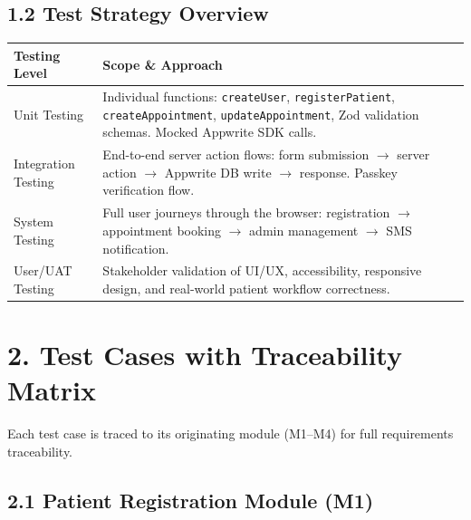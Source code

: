 \documentclass[12pt,a4paper]{article}
\begin{document}
\subsection{1.2 Test Strategy Overview}

\begin{tabular}{@{}p{3cm}p{11cm}@{}}
    \toprule
    \textbf{Testing Level} & \textbf{Scope \& Approach} \\
    \midrule
    Unit Testing        & Individual functions: \texttt{createUser}, \texttt{registerPatient}, \texttt{createAppointment}, \texttt{updateAppointment}, Zod validation schemas. Mocked Appwrite SDK calls. \\
    Integration Testing & End-to-end server action flows: form submission $\rightarrow$ server action $\rightarrow$ Appwrite DB write $\rightarrow$ response. Passkey verification flow. \\
    System Testing      & Full user journeys through the browser: registration $\rightarrow$ appointment booking $\rightarrow$ admin management $\rightarrow$ SMS notification. \\
    User/UAT Testing    & Stakeholder validation of UI/UX, accessibility, responsive design, and real-world patient workflow correctness. \\
    \bottomrule
\end{tabular}

\section{2. Test Cases with Traceability Matrix}

Each test case is traced to its originating module (M1--M4) for full requirements traceability.

\vspace{4pt}

\subsection{2.1 Patient Registration Module (M1)}
\end{document}
